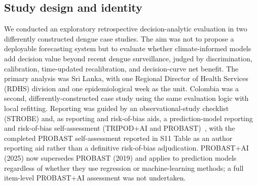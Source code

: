\documentclass[11pt,a4paper]{article}
\begin{document}
\subsection{Study design and identity}
We conducted an exploratory retrospective decision-analytic evaluation in two differently constructed dengue case studies. The aim was not to propose a deployable forecasting system but to evaluate whether climate-informed models add decision value beyond recent dengue surveillance, judged by discrimination, calibration, time-updated recalibration, and decision-curve net benefit. The primary analysis was Sri Lanka, with one Regional Director of Health Services (RDHS) division and one epidemiological week as the unit. Colombia was a second, differently-constructed case study using the same evaluation logic with local refitting. Reporting was guided by an observational-study checklist (STROBE) and, as reporting and risk-of-bias aids, a prediction-model reporting and risk-of-bias self-assessment (TRIPOD+AI and PROBAST)~\cite{vonElm2007,Collins2024TRIPODAI,Wolff2019,Moons2019}, with the completed PROBAST self-assessment reported in S11 Table as an author reporting aid rather than a definitive risk-of-bias adjudication. PROBAST+AI (2025) now supersedes PROBAST (2019) and applies to prediction models regardless of whether they use regression or machine-learning methods; a full item-level PROBAST+AI assessment was not undertaken.
\end{document}
